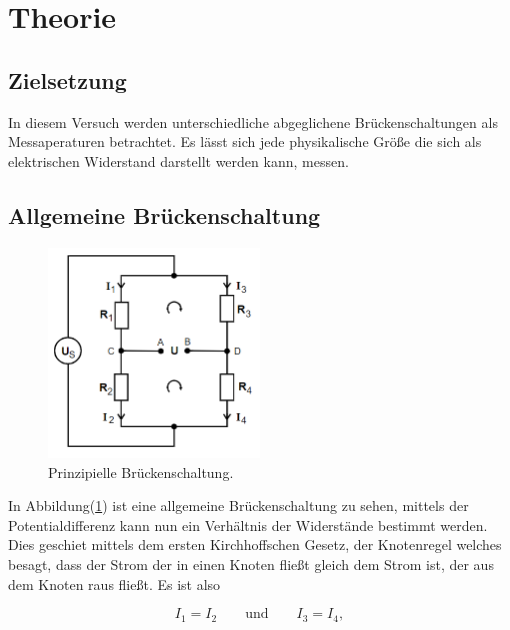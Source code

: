 \section{Theorie}

    \subsection{Zielsetzung}

        \noindent In diesem Versuch werden unterschiedliche abgeglichene Brückenschaltungen als Messaperaturen betrachtet. Es lässt sich 
        jede physikalische Größe die sich als elektrischen Widerstand darstellt werden kann, messen. 

    \subsection{Allgemeine Brückenschaltung}

        \begin{figure}[ht]
            \centering
            \includegraphics[width=0.5\textwidth]{latex/images/Prinzip_Brueck.PNG}
            \caption{Prinzipielle Brückenschaltung\protect \cite{V302}.}
            \label{img:Prinzip}
        \end{figure}

        \noindent In Abbildung(\ref{img:Prinzip}) ist eine allgemeine Brückenschaltung zu sehen, mittels der Potentialdifferenz kann nun ein 
        Verhältnis der Widerstände bestimmt werden. Dies geschiet mittels dem ersten Kirchhoffschen Gesetz, der Knotenregel welches besagt, 
        dass der Strom der in einen Knoten fließt gleich dem Strom ist, der aus dem Knoten raus fließt. Es ist also 

        \begin{equation*}
            I_1 = I_2 \quad \quad \text{und} \quad \quad I_3 = I_4 ,
        \end{equation*}


